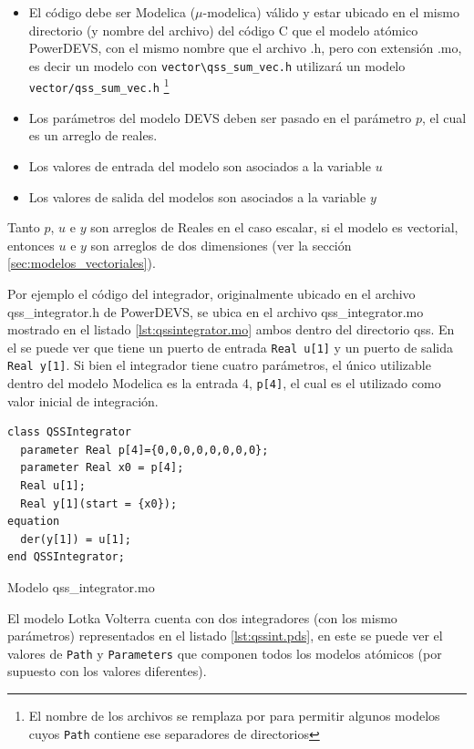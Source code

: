 \begin{itemize}
        \item El código debe ser Modelica ($\mu$-modelica) válido y estar ubicado en el mismo directorio (y nombre del archivo) del código C que el modelo atómico 
        PowerDEVS, con el mismo nombre que el archivo .h, pero con extensión .mo, es decir un modelo con \texttt{vector\textbackslash qss\_sum\_vec.h} 
	utilizará un modelo \texttt{vector/qss\_sum\_vec.h} \footnote{El nombre de los archivos se remplaza \quotes{\textbackslash} por \quotes{/} para permitir 
	algunos modelos cuyos \texttt{Path} contiene ese separadores de directorios}
        \item Los parámetros del modelo DEVS deben ser pasado en el parámetro $p$, el cual es un arreglo de reales. 
        \item Los valores de entrada del modelo son asociados a la variable $u$
        \item Los valores de salida del modelos son asociados a la variable $y$
\end{itemize}

	Tanto $p$, $u$ e $y$ son arreglos de Reales en el caso escalar, si el modelo es vectorial, entonces $u$ e $y$ son arreglos de dos dimensiones (ver la sección \ref{sec:modelos_vectoriales}).

        Por ejemplo el código del integrador, originalmente ubicado en el archivo qss\_integrator.h de PowerDEVS, se ubica en el archivo qss\_integrator.mo 
	mostrado en el listado \ref{lst:qssintegrator.mo} ambos dentro del directorio qss. En el se puede ver que tiene un puerto de entrada \texttt{Real u[1]} y un puerto de 
	salida \texttt{Real y[1]}. Si bien el integrador tiene cuatro parámetros, el único utilizable dentro del modelo Modelica es la entrada 4, \texttt{p[4]}, 
	el cual es el utilizado como valor inicial de integración.

\begin{listing}[H]
\begin{verbatim}
class QSSIntegrator
  parameter Real p[4]={0,0,0,0,0,0,0,0};
  parameter Real x0 = p[4];
  Real u[1];
  Real y[1](start = {x0});
equation
  der(y[1]) = u[1];
end QSSIntegrator;
\end{verbatim}
\caption{Modelo qss\_integrator.mo}
\label{lst:qssintegrator.mo}
\end{listing}

        El modelo Lotka Volterra cuenta con dos integradores (con los mismo parámetros) representados en el listado \ref{lst:qssint.pds}, en este se puede ver 
        el valores de \texttt{Path} y \texttt{Parameters} que componen todos los modelos atómicos (por supuesto con los valores diferentes).

